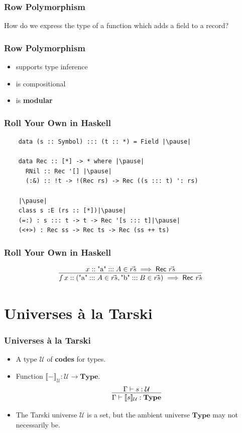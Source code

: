 \documentclass[12pt]{beamer}
\begin{document}
\begin{frame}
  \frametitle{Row Polymorphism}\pause
  How do we express the type of a function which adds a field to a record?\pause
\end{frame}

\begin{frame}
  \frametitle{Row Polymorphism}\pause
  \begin{itemize}
    \item supports type inference\pause
    \item is compositional\pause
    \item is \textbf{modular}\pause
  \end{itemize}
\end{frame}

\begin{frame}[fragile]
  \frametitle{Roll Your Own in Haskell}\pause
  \begin{lstlisting}
    data (s :: Symbol) ::: (t :: *) = Field |\pause|

    data Rec :: [*] -> * where |\pause|
      RNil :: Rec '[] |\pause|
      (:&) :: !t -> !(Rec rs) -> Rec ((s ::: t) ': rs)

    |\pause|
    class s :E (rs :: [*])|\pause|
    (=:) : s ::: t -> t -> Rec '[s ::: t]|\pause|
    (<+>) : Rec ss -> Rec ts -> Rec (ss ++ ts)
  \end{lstlisting}
\end{frame}
\begin{frame}
  \frametitle{Roll Your Own in Haskell}\pause
  \[
    \infer{
      f\, x :: (\text{"a"} ::: A\in\vec{rs}, \text{"b"} ::: B\in\vec{rs}) \implies \mathsf{Rec}\ \vec{rs}
    }{
      x :: \text{"a"} ::: A\in\vec{rs}\implies \mathsf{Rec}\ \vec{rs}
    }
  \]
\end{frame}

\section{Universes \`a la Tarski}

\begin{frame}
  \frametitle{Universes \`a la Tarski}\pause
  \begin{itemize}
    \item A type $\mathcal{U}$ of \textbf{codes} for types.
      \pause
    \item Function $\llbracket-\rrbracket_\mathcal{U} : \mathcal{U}\to\mathbf{Type}$.
      \pause
      \[
        \infer{
          \Gamma\vdash\llbracket s\rrbracket_\mathcal{U} : \mathbf{Type}
        }{
          \Gamma\vdash s : \mathcal{U}
        }
      \]
    \pause
    \item The Tarski universe $\mathcal{U}$ is a set, but the ambient universe $\mathbf{Type}$ may not necessarily be.
  \end{itemize}
\end{frame}
\end{document}
